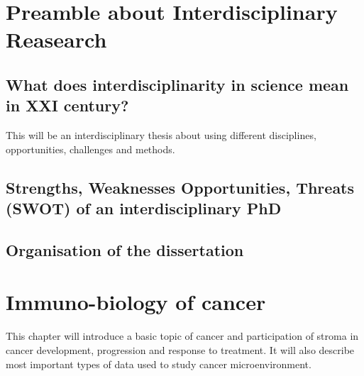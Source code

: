 \documentclass[12pt,]{book}
\theoremstyle{definition}
\theoremstyle{definition}
\theoremstyle{definition}
\theoremstyle{remark}
\begin{document}
{
\hypersetup{linkcolor=black}
\setcounter{tocdepth}{4}
\tableofcontents
}
\hypersetup{linkcolor=black}
\listoftables

\hypersetup{linkcolor=black}
\listoffigures
\hypertarget{preamble-about-interdisciplinary-reasearch}{%
\chapter*{Preamble about Interdisciplinary
Reasearch}\label{preamble-about-interdisciplinary-reasearch}}

\setcounter{page}{13}

\hypertarget{what-does-interdisciplinarity-in-science-mean-in-xxi-century}{%
\section{What does interdisciplinarity in science mean in XXI
century?}\label{what-does-interdisciplinarity-in-science-mean-in-xxi-century}}

This will be an interdisciplinary thesis about using different
disciplines, opportunities, challenges and methods.

\hypertarget{strengths-weaknesses-opportunities-threats-swot-of-an-interdisciplinary-phd}{%
\section{Strengths, Weaknesses Opportunities, Threats (SWOT) of an
interdisciplinary
PhD}\label{strengths-weaknesses-opportunities-threats-swot-of-an-interdisciplinary-phd}}

\hypertarget{organisation-of-the-dissertation}{%
\section{Organisation of the
dissertation}\label{organisation-of-the-dissertation}}

\hypertarget{intro}{%
\chapter{Immuno-biology of cancer}\label{intro}}

This chapter will introduce a basic topic of cancer and participation of
stroma in cancer development, progression and response to treatment. It
will also describe most important types of data used to study cancer
microenvironment.
\end{document}
